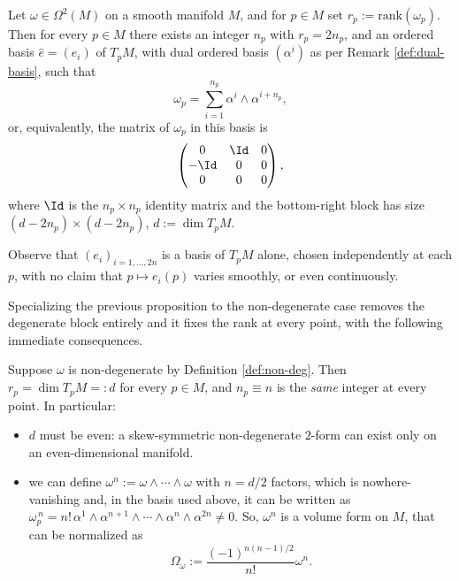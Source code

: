 \begin{proposition}\label{prop:skew-normal-form-manifold}
	Let $\omega \in \Omega^2(M)$ on a smooth manifold $M$, and for $p \in M$ set $r_p := \mathrm{rank}(\omega_p)$. Then for every $p \in M$ there exists an integer $n_p$ with $r_p = 2n_p$, and an ordered basis $\hat e = (e_i)$ of $T_pM$, with dual ordered basis $(\alpha^i)$ as per Remark \ref{def:dual-basis}, such that
	\[
	\omega_p = \sum_{i=1}^{n_p} \alpha^i \wedge \alpha^{i+n_p},
	\]
	or, equivalently, the matrix of $\omega_p$ in this basis is
	\[
	\begin{pmatrix}
		0 & \Id & 0 \\
		-\Id & 0 & 0 \\
		0 & 0 & 0
	\end{pmatrix},
	\]
	where $\Id$ is the $n_p \times n_p$ identity matrix and the bottom-right block has size $(d-2n_p)\times(d-2n_p)$, $d := \dim T_pM$.
\end{proposition}

\begin{remark}
	Observe that $(e_i)_{i=1,...,2n}$ is a basis of $T_pM$ alone, chosen independently at each $p$, with no claim that $p \mapsto e_i(p)$ varies smoothly, or even continuously.
\end{remark}

\noindent Specializing the previous proposition to the non-degenerate case removes the degenerate block entirely and it fixes the rank at every point, with the following immediate consequences.

\begin{corollary}\label{cor:omega-prop}
	Suppose $\omega$ is non-degenerate by Definition \ref{def:non-deg}. Then $r_p = \dim T_pM =: d$ for every $p \in M$, and $n_p \equiv n$ is the \emph{same} integer at every point. In particular:
	\begin{itemize}
		\item $d$ must be even: a skew-symmetric non-degenerate $2$-form can exist only on an even-dimensional manifold.
		\item we can define $\omega^n := \omega \wedge \cdots \wedge \omega$ with $n=d/2$ factors, which is nowhere-vanishing and, in the basis used above, it can be written as $\omega_p^{\,n} = n!\,\alpha^1\wedge\alpha^{n+1}\wedge\cdots\wedge\alpha^n\wedge\alpha^{2n} \neq 0$. So, $\omega^n$ is a volume form on $M$, that can be normalized as
		\[
		\Omega_\omega := \frac{(-1)^{n(n-1)/2}}{n!} \omega^n.
		\]
	\end{itemize}
\end{corollary}

